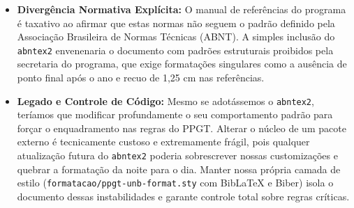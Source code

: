 \documentclass[a4paper,12pt]{article}
\begin{document}
\begin{itemize}
    \item \textbf{Divergência Normativa Explícita:} O manual de referências do programa é taxativo ao afirmar que estas normas não seguem o padrão definido pela Associação Brasileira de Normas Técnicas (ABNT). A simples inclusão do \texttt{abntex2} envenenaria o documento com padrões estruturais proibidos pela secretaria do programa, que exige formatações singulares como a ausência de ponto final após o ano e recuo de 1,25 cm nas referências.
    \item \textbf{Legado e Controle de Código:} Mesmo se adotássemos o \texttt{abntex2}, teríamos que modificar profundamente o seu comportamento padrão para forçar o enquadramento nas regras do PPGT. Alterar o núcleo de um pacote externo é tecnicamente custoso e extremamente frágil, pois qualquer atualização futura do \texttt{abntex2} poderia sobrescrever nossas customizações e quebrar a formatação da noite para o dia. Manter nossa própria camada de estilo (\texttt{formatacao/ppgt-unb-format.sty} com BibLaTeX e Biber) isola o documento dessas instabilidades e garante controle total sobre regras críticas.
\end{itemize}
\end{document}
